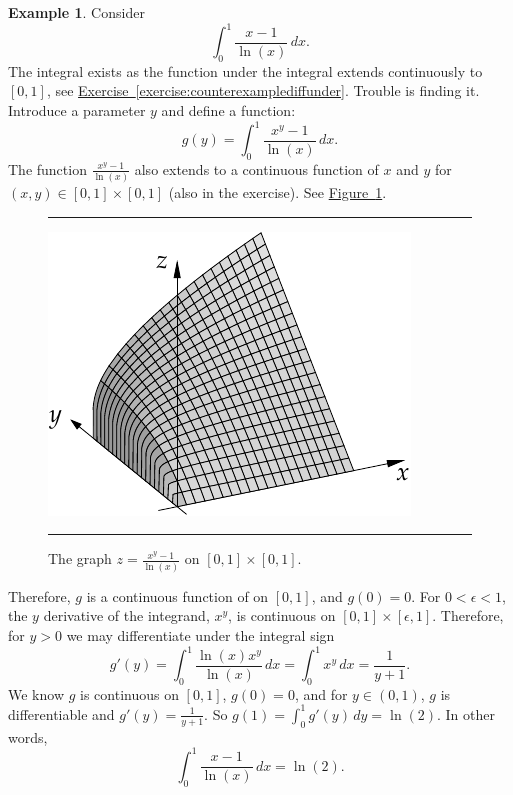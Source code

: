\documentclass[12pt,openany]{book}
\theoremstyle{plain}
\theoremstyle{remark}
\theoremstyle{definition}
\newenvironment{myfig}{%
\begin{figure}[h!t]
\noindent\rule{\textwidth}{0.5pt}\vspace{12pt}\par\centering}%
{\par\noindent\rule{\textwidth}{0.5pt}
\end{figure}}
\theoremstyle{exercise}
\theoremstyle{example}
\newtheorem{example}[thm]{Example}
\newcommand{\figureref}[1]{\hyperref[#1]{Figure~\ref*{#1}}}
\newcommand{\exerciseref}[1]{\hyperref[#1]{Exercise~\ref*{#1}}}
\begin{document}
\begin{example} \label{example:counterexamplediffunder}
Consider
\begin{equation*}
\int_0^{1} \frac{x-1}{\ln(x)} \,dx .
\end{equation*}
The integral exists as the function under the integral 
extends continuously to $[0,1]$, see \exerciseref{exercise:counterexamplediffunder}.
Trouble is finding it.  Introduce a parameter $y$
and define a function:
\begin{equation*}
g(y) = \int_0^{1} \frac{x^y-1}{\ln(x)} \,dx .
\end{equation*}
The function
$\frac{x^y-1}{\ln(x)}$
also extends to a continuous function of $x$ and $y$
for $(x,y) \in [0,1] \times [0,1]$ (also in the exercise).
See \figureref{fig:diffunderexample}.
\begin{myfig}
\includegraphics{figures/diffunderexample}
\caption{The graph $z= \frac{x^y-1}{\ln(x)}$ on $[0,1] \times [0,1]$.\label{fig:diffunderexample}}
\end{myfig}

Therefore,
$g$ is a continuous function of on $[0,1]$, and $g(0) = 0$.
For $0 < \epsilon < 1$, the $y$ derivative of the integrand, $x^y$,
is continuous on $[0,1] \times [\epsilon,1]$.  Therefore,
for $y >0$ we may differentiate under the integral sign
\begin{equation*}
g'(y) =
\int_0^{1} \frac{\ln(x) x^y}{\ln(x)} \,dx 
=
\int_0^{1} x^y \,dx =
\frac{1}{y+1} .
\end{equation*}
We know $g$ is continuous on $[0,1]$, $g(0)=0$, and
for $y \in (0,1)$, $g$ is differentiable and
$g'(y) = \frac{1}{y+1}$.  So $g(1) = \int_0^1 g'(y)\,dy = \ln(2)$.
In other words,
\begin{equation*}
\int_0^{1} \frac{x-1}{\ln(x)} \,dx  = \ln(2).
\end{equation*}
\end{example}
\end{document}
